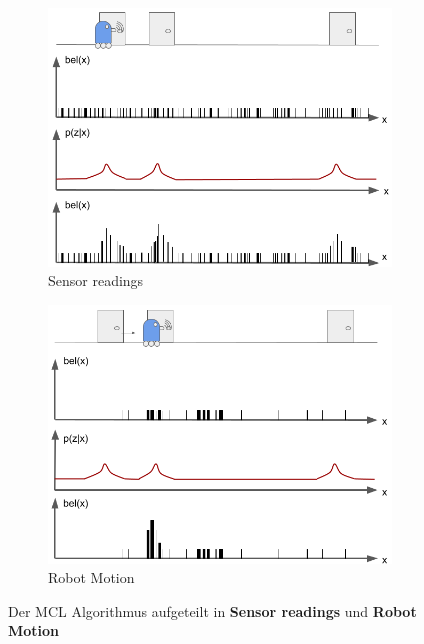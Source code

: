 \begin{figure}
  \begin{subfigure}[t]{.5\textwidth}
    \centering
    \includegraphics[width=.9\linewidth]{pic/loesungen/1a_mcl.png}
    \caption{Sensor readings}
    \label{fig:s_mcl_sensor}
  \end{subfigure}\hfill
  \begin{subfigure}[t]{.5\textwidth}
    \centering
    \includegraphics[width=.9\linewidth]{pic/loesungen/1b_mcl.png}
    \caption{Robot Motion}
    \label{fig:s_mcl_motion}
  \end{subfigure}
  \caption{Der MCL Algorithmus aufgeteilt in \textbf{Sensor readings} und \textbf{Robot Motion}}
  \label{fig:mcl}
\end{figure}
\mbox{}


